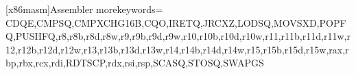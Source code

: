\newenvironment{imagesmc}[3][]{%
	\def\envimageslabelvar {#1}%
	\def\envimagesmcpos {#2}%
	\def\envimagescaptionvar {#3}%
	\global\def\GLOBALenvimageinitialized {true}%
	\global\def\GLOBALenvimageadded {false}%
	\checkinsidemulticol%
	\checkoutsideappendix%
	
	\setcaptionmargincm{\captionmarginmultimg} %
	
	\ifthenelse{\equal{#2}{bottom}}{%
		\begin{figure*}[b] \centering%
	}{%
	\ifthenelse{\equal{#2}{top}}{%
		\begin{figure*}[t] \centering%
	}{%
		\errmessage{LaTeX Warning: Posicion de imagen invalida, valores esperados: bottom,top}
		\stop
	}}%
		\corevspacevarcm{\marginimagemulttop}%
	}{%
		\setcaptionmargincm{\captionlrmargin}%
		\ifthenelse{\equal{\envimagescaptionvar}{}}{ %
			\corevspacevarcm{\captionlessmarginimage}%
		}{%
			\corevspacevarcm{\captionmarginimagesmc}%
			\caption{\envimagescaptionvar\envimageslabelvar}%
		}%
	\end{figure*}%
	
	\setcaptionmargincm{\captionlrmarginmc}%
	
	\global\def\GLOBALenvimageinitialized {false}%
}




[x86masm]{Assembler}{
	morekeywords={
		CDQE,CMPSQ,CMPXCHG16B,CQO,IRETQ,JRCXZ,LODSQ,MOVSXD,POPFQ,PUSHFQ,r8,r8b,r8d,r8w,r9,r9b,r9d,r9w,r10,r10b,r10d,r10w,r11,r11b,r11d,r11w,r12,r12b,r12d,r12w,r13,r13b,r13d,r13w,r14,r14b,r14d,r14w,r15,r15b,r15d,r15w,rax,rbp,rbx,rcx,rdi,RDTSCP,rdx,rsi,rsp,SCASQ,STOSQ,SWAPGS
	}
}

